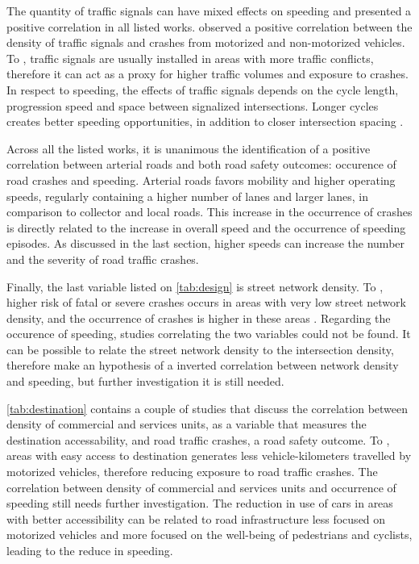 The quantity of traffic signals can have mixed effects on speeding and presented a positive correlation in all listed works. \textcite{Lovegrove2006,Lee2015} observed a positive correlation between the density of traffic signals and crashes from motorized and non-motorized vehicles. To \textcite{Obelheiro2020}, traffic signals are usually installed in areas with more traffic conflicts, therefore it can act as a proxy for higher traffic volumes and exposure to crashes. In respect to speeding, the effects of traffic signals depends on the cycle length, progression speed and space between signalized intersections. Longer cycles creates better speeding opportunities, in addition to closer intersection spacing \cite{Elvik2009,Furth2018}. 

Across all the listed works, it is unanimous the identification of a positive correlation between arterial roads and both road safety outcomes: occurence of road crashes and speeding. Arterial roads favors mobility and higher operating speeds, regularly containing a higher number of lanes and larger lanes, in comparison to collector and local roads. This increase in the occurrence of crashes is directly related to the increase in overall speed and the occurrence of speeding episodes. As discussed in the last section, higher speeds can increase the number and the severity of road traffic crashes. 

Finally, the last variable listed on \autoref{tab:design} is street network density. To \textcite{Marshall2010}, higher risk of fatal or severe crashes occurs in areas with very low street network density, and the occurrence of crashes is higher in these areas \cite{Marshall2010}. Regarding the occurence of speeding, studies correlating the two variables could not be found. It can be possible to relate the street network density to the intersection density, therefore make an hypothesis of a inverted correlation between network density and speeding, but further investigation it is still needed. 

\autoref{tab:destination} contains a couple of studies that discuss the correlation between density of commercial and services units, as a variable that measures the destination accessability, and road traffic crashes, a road safety outcome. To \textcite{Ouyang2014,Welle2016}, areas with easy access to destination generates less vehicle-kilometers travelled by motorized vehicles, therefore reducing exposure to road traffic crashes. The correlation between density of commercial and services units and occurrence of speeding still needs further investigation. The reduction in use of cars in areas with better accessibility can be related to road infrastructure less focused on motorized vehicles and more focused on the well-being of pedestrians and cyclists, leading to the reduce in speeding. 

